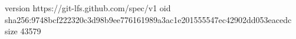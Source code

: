 version https://git-lfs.github.com/spec/v1
oid sha256:9748bcf222320c3d98b9ee776161989a3ac1e201555547ec42902dd053eacedc
size 43579
